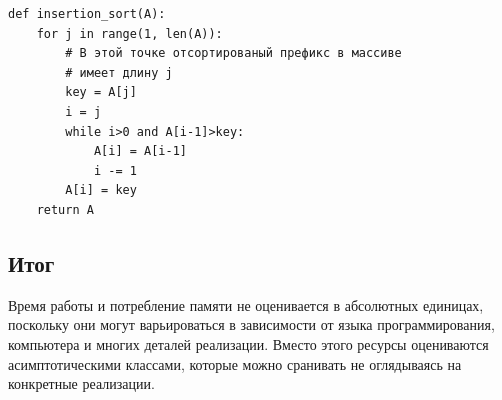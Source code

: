 \documentclass[12pt,a4paper]{report}
\begin{document}
\begin{verbatim}
def insertion_sort(A):
    for j in range(1, len(A)):
        # В этой точке отсортированый префикс в массиве
        # имеет длину j
        key = A[j]
        i = j
        while i>0 and A[i-1]>key:
            A[i] = A[i-1]
            i -= 1
        A[i] = key
    return A
\end{verbatim}




\subsection*{Итог}

Время работы и потребление памяти не оценивается в абсолютных единицах, поскольку они могут варьироваться в зависимости от языка программирования, компьютера и многих деталей реализации. Вместо этого ресурсы оцениваются асимптотическими классами, которые можно сранивать не оглядываясь на конкретные реализации.
\end{document}
